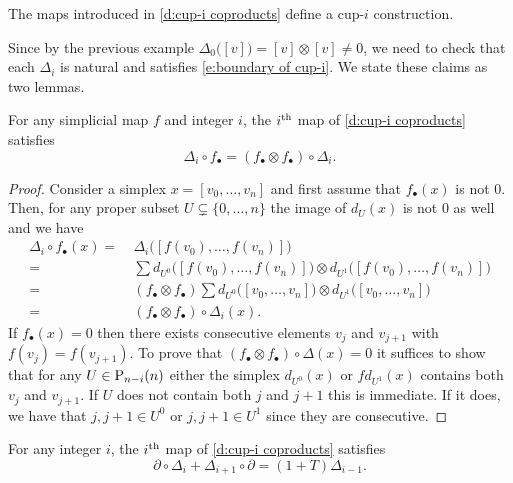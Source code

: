 \begin{theorem} \label{t:main}
	The maps introduced in \cref{d:cup-i coproducts} define a cup-$i$ construction.
\end{theorem}

Since by the previous example $\Delta_0\big([v]\big) = [v] \otimes [v] \neq 0$, we need to check that each $\Delta_i$ is natural and satisfies \eqref{e:boundary of cup-i}.
We state these claims as two lemmas.

\begin{lemma} \label{l:naturality}
	For any simplicial map $f$ and integer $i$, the $i^\th$ map of \cref{d:cup-i coproducts} satisfies
	\begin{equation*}
	\Delta_i \circ f_\bullet = (f_\bullet \otimes f_\bullet) \circ \Delta_i.
	\end{equation*}
\end{lemma}

\begin{proof}
	Consider a simplex $x = [v_0, \dots, v_n]$ and first assume that $f_\bullet(x)$ is not $0$.
	Then, for any proper subset $U \subsetneq \{0, \dots, n\}$ the image of $d_U(x)$ is not $0$ as well and we have
	\begin{align*}
	\Delta_i \circ f_\bullet(x) =\ &
	\Delta_i \big([f(v_0), \dots, f(v_n)]\big) \\ =\ &
	\sum d_{U^0} \big([f(v_0), \dots, f(v_n)]\big) \otimes d_{U^1} \big([f(v_0), \dots, f(v_n)]\big) \\ =\ &
	(f_\bullet \otimes f_\bullet) \sum d_{U^0} \big([v_0, \dots, v_n]\big) \otimes d_{U^1} \big([v_0, \dots, v_n]\big) \\ =\ &
	(f_\bullet \otimes f_\bullet) \circ \Delta_i(x).
	\end{align*}
	If $f_\bullet(x) = 0$ then there exists consecutive elements $v_j$ and $v_{j+1}$ with $f(v_j) = f(v_{j+1})$.
	To prove that $(f_\bullet \otimes f_\bullet) \circ \Delta(x) = 0$ it suffices to show that for any $U \in \P_{n-i}(n)$ either the simplex $d_{U^0}(x)$ or $f d_{U^1}(x)$ contains both $v_j$ and $v_{j+1}$.
	If $U$ does not contain both $j$ and $j+1$ this is immediate.
	If it does, we have that $j, j+1 \in U^0$ or $j, j+1 \in U^1$ since they are consecutive.
\end{proof}

\begin{lemma} \label{l:main}
	For any integer $i$, the $i^\th$ map of \cref{d:cup-i coproducts} satisfies
	\begin{equation*}
	\partial \circ \Delta_{i} + \Delta_{i+1} \circ \partial = (1+T) \Delta_{i-1}.
	\end{equation*}
\end{lemma}

